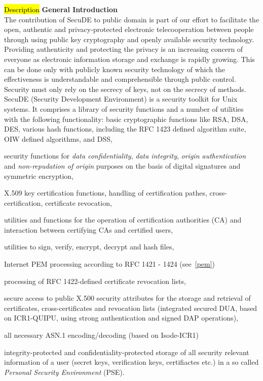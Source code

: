 \label{intro1}
\hl{Description}
{\bf General Introduction}
\\ [1em]
The contribution of SecuDE to public domain is part of our effort to 
facilitate the open, authentic and privacy-protected electronic 
telecooperation between people through using public key cryptography and openly 
available security technology. Providing authenticity and protecting the 
privacy is an increasing concern of everyone as electronic information 
storage and exchange is rapidly growing. This can be done only with publicly known
security technology of which the effectiveness is understandable and 
comprehensible through public control. Security must only rely on the secrecy
of keys, not on the secrecy of methods. 
\\ [1em]
SecuDE (Security Development Environment) is a security toolkit for
Unix systems. It comprises a library of security functions and a
number of utilities with the following functionality:
\bi
\m basic cryptographic functions like RSA, DSA, DES, various hash functions, 
   including the RFC 1423 defined algorithm suite, 
   OIW defined algorithms, and DSS,

\m security functions for {\em data confidentiality}, {\em data integrity}, 
   {\em origin authentication} and {\em non-repudation of origin} purposes 
   on the basis of digital signatures and symmetric encryption,

\m X.509 key certification functions, handling of certification pathes, 
   cross-certification, certificate revocation,

\m utilities and functions for the operation of certification authorities 
   (CA) and interaction between certifying CAs and certified users,

\m utilities to sign, verify, encrypt, decrypt and hash files,

\m Internet PEM processing according to RFC 1421 - 1424 (see~\ref{pem})

\m processing of RFC 1422-defined certificate revocation lists,

\m secure access to public X.500 security attributes for the storage 
   and retrieval of certificates, cross-certificates and revocation 
   lists (integrated secured DUA, based on ICR1-QUIPU, using strong 
   authentication and signed DAP operations),

\m all necessary ASN.1 encoding/decoding (based on Isode-ICR1)

\m integrity-protected and confidentiality-protected storage of all security 
   relevant information of a user (secret keys, verification keys, certifiactes
   etc.) in a so called {\em Personal Security Environment} (PSE).
\ei
 
